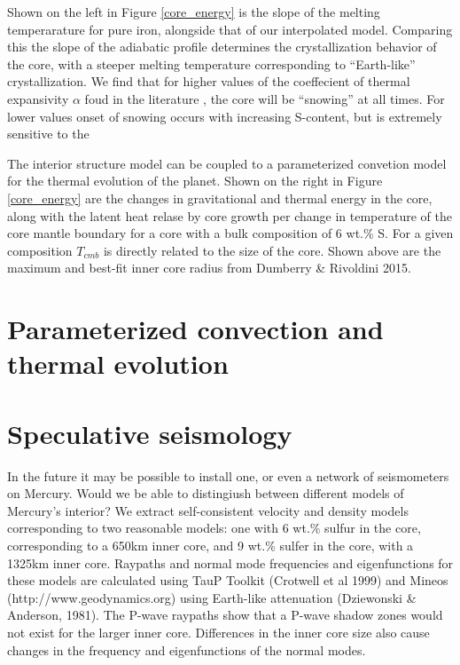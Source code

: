 \documentclass[landscape,a0b,final]{a0poster}
\begin{document}
\begin{multicols}{3}
\columnbreak

Shown on the left in Figure \ref{core_energy} is the slope of the melting temperarature for pure iron, alongside that
of our interpolated model. Comparing this the slope of the adiabatic profile
determines the crystallization behavior of the core, with a steeper melting
temperature corresponding to  ``Earth-like'' crystallization. We find that for higher
values of the coeffecient of thermal expansivity $\alpha$ foud in the literature
, the core will be ``snowing'' at all times. For lower values
onset of snowing occurs with increasing S-content, but is extremely sensitive to the

The interior structure model can be coupled to a parameterized convetion model for
the thermal evolution of the planet. Shown on the right in Figure \ref{core_energy} are the changes in gravitational
and thermal energy in the core, along with the latent heat relase by core growth per
change in temperature of the core mantle boundary for a core with a bulk composition
of 6 wt.\% S. For a given composition $T_{cmb}$ is directly related to the size of
the core. Shown above are the maximum and best-fit inner core radius from
Dumberry \& Rivoldini 2015.


\section*{Parameterized convection and thermal evolution}



\section*{Speculative seismology}

In the future it may be possible to install one, or even a network of seismometers on Mercury. Would we be able to distingiush between different models of Mercury's interior? We extract self-consistent velocity and density models corresponding to two reasonable models: one with 6 wt.\% sulfur in the core, corresponding to a 650km inner core, and 9 wt.\% sulfer in the core, with a 1325km inner core.
Raypaths and normal mode frequencies and eigenfunctions for these models are calculated using TauP Toolkit (Crotwell et al 1999) and Mineos (http://www.geodynamics.org) using Earth-like attenuation (Dziewonski \&  Anderson, 1981). The P-wave raypaths show that a P-wave shadow zones would not exist for the larger inner core. Differences in the inner core size also cause changes in the frequency and eigenfunctions of the normal modes. 


\end{multicols}
\end{document}
